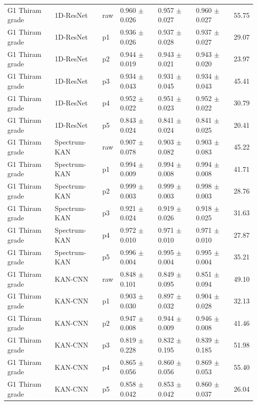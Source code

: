 {\begin{longtable}{L{2.35cm}L{2.4cm}L{1.0cm}L{2.35cm}L{2.25cm}L{2.25cm}L{1.45cm}}
G1 Thiram grade & 1D-ResNet & raw & 0.960 $\pm$ 0.026 & 0.957 $\pm$ 0.027 & 0.960 $\pm$ 0.027 & 55.75 \\
G1 Thiram grade & 1D-ResNet & p1 & 0.936 $\pm$ 0.026 & 0.937 $\pm$ 0.028 & 0.937 $\pm$ 0.027 & 29.07 \\
G1 Thiram grade & 1D-ResNet & p2 & 0.944 $\pm$ 0.019 & 0.943 $\pm$ 0.021 & 0.943 $\pm$ 0.020 & 23.97 \\
G1 Thiram grade & 1D-ResNet & p3 & 0.934 $\pm$ 0.043 & 0.931 $\pm$ 0.045 & 0.934 $\pm$ 0.043 & 45.41 \\
G1 Thiram grade & 1D-ResNet & p4 & 0.952 $\pm$ 0.022 & 0.951 $\pm$ 0.023 & 0.952 $\pm$ 0.022 & 30.79 \\
G1 Thiram grade & 1D-ResNet & p5 & 0.843 $\pm$ 0.024 & 0.841 $\pm$ 0.024 & 0.841 $\pm$ 0.025 & 20.41 \\
G1 Thiram grade & Spectrum-KAN & raw & 0.907 $\pm$ 0.078 & 0.903 $\pm$ 0.082 & 0.903 $\pm$ 0.083 & 45.22 \\
G1 Thiram grade & Spectrum-KAN & p1 & 0.994 $\pm$ 0.009 & 0.994 $\pm$ 0.008 & 0.994 $\pm$ 0.008 & 41.71 \\
G1 Thiram grade & Spectrum-KAN & p2 & 0.999 $\pm$ 0.003 & 0.999 $\pm$ 0.003 & 0.998 $\pm$ 0.003 & 28.76 \\
G1 Thiram grade & Spectrum-KAN & p3 & 0.921 $\pm$ 0.024 & 0.919 $\pm$ 0.026 & 0.918 $\pm$ 0.025 & 31.63 \\
G1 Thiram grade & Spectrum-KAN & p4 & 0.972 $\pm$ 0.010 & 0.971 $\pm$ 0.010 & 0.971 $\pm$ 0.010 & 27.87 \\
G1 Thiram grade & Spectrum-KAN & p5 & 0.996 $\pm$ 0.004 & 0.995 $\pm$ 0.004 & 0.995 $\pm$ 0.004 & 35.21 \\
G1 Thiram grade & KAN-CNN & raw & 0.848 $\pm$ 0.101 & 0.849 $\pm$ 0.095 & 0.851 $\pm$ 0.094 & 49.10 \\
G1 Thiram grade & KAN-CNN & p1 & 0.903 $\pm$ 0.030 & 0.897 $\pm$ 0.032 & 0.904 $\pm$ 0.028 & 32.13 \\
G1 Thiram grade & KAN-CNN & p2 & 0.947 $\pm$ 0.008 & 0.944 $\pm$ 0.009 & 0.946 $\pm$ 0.008 & 41.46 \\
G1 Thiram grade & KAN-CNN & p3 & 0.819 $\pm$ 0.228 & 0.832 $\pm$ 0.195 & 0.839 $\pm$ 0.185 & 51.98 \\
G1 Thiram grade & KAN-CNN & p4 & 0.865 $\pm$ 0.056 & 0.860 $\pm$ 0.056 & 0.869 $\pm$ 0.053 & 55.40 \\
G1 Thiram grade & KAN-CNN & p5 & 0.858 $\pm$ 0.042 & 0.853 $\pm$ 0.042 & 0.860 $\pm$ 0.037 & 26.04 \\

\end{longtable}}
